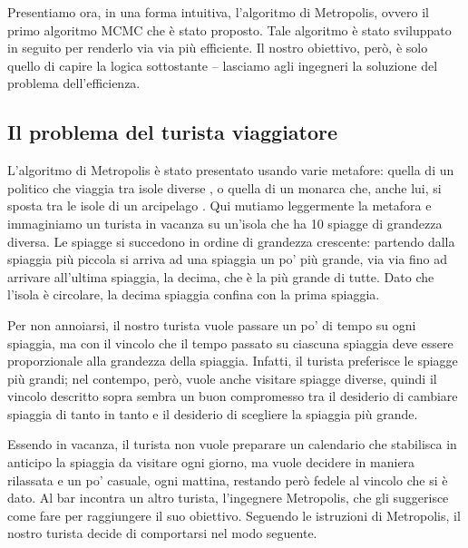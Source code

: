 Presentiamo ora, in una forma intuitiva, l'algoritmo di Metropolis, ovvero il primo algoritmo MCMC che è stato proposto.
Tale algoritmo è stato  sviluppato in seguito per renderlo via via più efficiente.
Il nostro obiettivo, però, è solo quello di capire la logica sottostante -- lasciamo agli ingegneri la soluzione del problema dell'efficienza.


\subsection{Il problema del turista viaggiatore}
\label{sec:turista_viagg}

L'algoritmo di Metropolis è stato presentato usando varie metafore: quella di un politico che viaggia tra isole diverse \citep{doing_bayesian_data_an}, o quella di un monarca che, anche lui, si sposta tra le isole di un arcipelago \citep{stat_rethinking}.
Qui mutiamo leggermente la metafora e immaginiamo un turista in vacanza su un'isola che ha 10 spiagge di grandezza diversa.
Le spiagge si succedono in ordine di grandezza crescente: partendo dalla spiaggia più piccola si arriva ad una spiaggia un po' più grande, via via fino ad arrivare all'ultima spiaggia, la decima, che è la più grande di tutte.  
Dato che l'isola è circolare, la decima spiaggia confina con la prima spiaggia.

Per non annoiarsi, il nostro turista vuole passare un po' di tempo su ogni spiaggia, ma con il vincolo che il tempo passato su ciascuna spiaggia deve essere proporzionale alla grandezza della spiaggia.  
Infatti, il turista preferisce le spiagge più grandi; nel contempo, però, vuole anche visitare spiagge diverse, quindi il vincolo descritto sopra sembra un buon compromesso tra il desiderio di cambiare spiaggia di tanto in tanto e il desiderio di scegliere la spiaggia più grande.

Essendo in vacanza, il turista non vuole preparare un calendario che stabilisca in anticipo la spiaggia da visitare ogni giorno, ma vuole decidere in maniera rilassata e un po' casuale, ogni mattina, restando però fedele al vincolo che si è dato.
Al bar incontra un altro turista, l'ingegnere Metropolis, che gli suggerisce come fare per raggiungere il suo obiettivo.
Seguendo le istruzioni di Metropolis, il nostro turista decide di comportarsi nel modo seguente.


